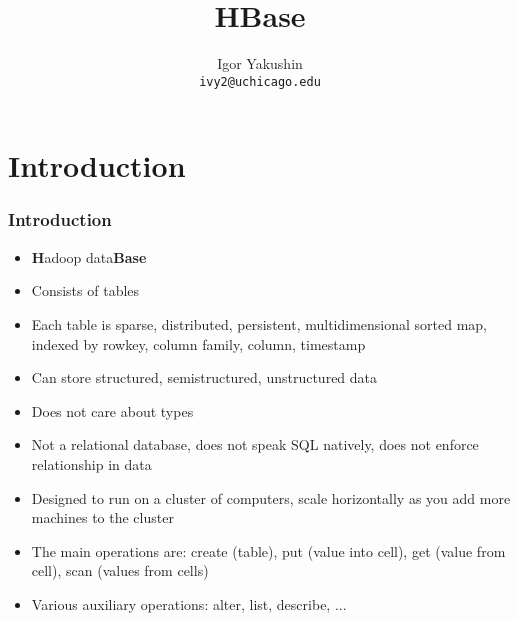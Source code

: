 \documentclass{beamer}
\title{\huge{HBase}}
\author{Igor Yakushin \\ \texttt{ivy2@uchicago.edu}}
\date{}
\begin{document}



\begin{frame}
\titlepage
\end{frame}


\section{Introduction}
\begin{frame}
  \frametitle{Introduction}
  \begin{itemize}
  \item {\color{mycolordef}\textbf{H}}adoop data{\color{mycolordef}\textbf{Base}}
  \item Consists of tables
  \item Each table is sparse, distributed, persistent, multidimensional sorted map, indexed by rowkey, column family, column, timestamp
  \item Can store structured, semistructured, unstructured data
  \item Does not care about types
  \item Not a relational database, does not speak SQL natively, does not enforce relationship in data
  \item Designed to run on a cluster of computers, scale horizontally as you add more machines to the cluster
  \item The main operations are: create (table), put (value into cell), get (value from cell), scan (values from cells)
  \item Various auxiliary operations: alter, list, describe, ...
  \end{itemize}
\end{frame}
\end{document}

